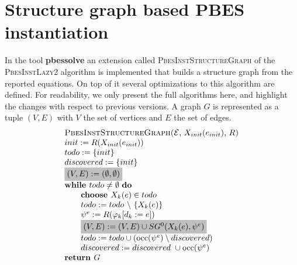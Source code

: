 \documentclass{article}
\begin{document}
\section{Structure graph based PBES instantiation}

In the tool \textbf{pbessolve} an extension called \textsc{%
PbesInstStructureGraph} of the \textsc{PbesInstLazy2} algorithm is
implemented that builds a structure graph from the reported equations. On
top of it several optimizations to this algorithm are defined. For
readability, we only present the full algorithms here, and highlight the
changes with respect to previous versions. A graph $G$ is
represented as a tuple $(V,E)$ with $V$ the set of vertices and $E$ the set
of edges.%
\begin{equation*}
\begin{array}{l}
\text{\textsc{PbesInstStructureGraph(}}\mathcal{E}\text{, }X_{init}(e_{init})%
\text{, }R\text{\textsc{)}} \\
init:=R(X_{init}(e_{init})) \\
todo:=\{init\} \\
discovered:=\{init\} \\
\colorbox{lightgray}{$%
(V,E) :=(\emptyset ,\emptyset ) $}\\
\text{\textbf{while }}todo\neq \emptyset \text{ \textbf{do}} \\
\qquad \text{\textbf{choose }}X_{k}(e)\in todo \\
\qquad todo:=todo\ \backslash \ \{X_{k}(e)\} \\
\qquad \psi ^{e}:=R(\varphi _{k}[d_{k}:=e]) \\
\qquad \colorbox{lightgray}{$%
(V,E) := (V,E) \cup SG^{0}(X_{k}(e),\psi ^{e}) $}\\
\qquad todo:=todo\cup (\mathrm{occ}(\psi ^{e})\setminus discovered) \\
\qquad discovered:=discovered\ \cup \mathrm{occ}(\psi ^{e}) \\
\text{\textbf{return }}G%
\end{array}%
\end{equation*}
\end{document}
